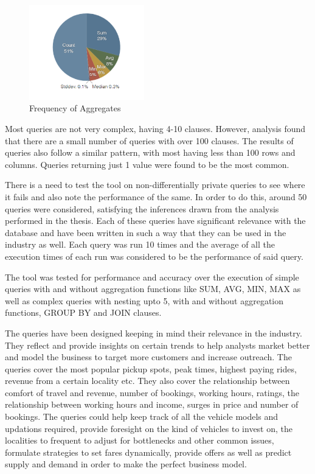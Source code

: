 \documentclass[acmsmall]{acmart}
\begin{document}
\begin{figure}[htp]
    \centering
    \includegraphics[width=5cm]{Fig 4.2.3.png}
    \caption{Frequency of Aggregates}
    \label{fig:4.2.3}
\end{figure}

Most queries are not very complex, having 4-10 clauses. However, analysis found that there are a small number of queries with over 100 clauses. The results of queries also follow a similar pattern, with most having less than 100 rows and columns. Queries returning just 1 value were found to be the most common.

There is a need to test the tool on non-differentially private queries to see where it fails and also note the performance of the same. In order to do this, around 50 queries were considered, satisfying the inferences drawn from the analysis performed in the thesis. Each of these queries have significant relevance with the database and have been written in such a way that they can be used in the industry as well. Each  query was run 10 times and the average of all the execution times of each run was considered to be the performance of said query. 

The tool was tested for performance and accuracy over the execution of simple queries with and without aggregation functions like SUM, AVG, MIN, MAX as well as complex queries with nesting upto 5, with and without aggregation functions, GROUP BY and JOIN clauses.

The queries have been designed keeping in mind their relevance in the industry. They reflect and provide insights on certain trends to help analysts market better and model the business to target more customers and increase outreach. The queries cover the most popular pickup spots, peak times, highest paying rides, revenue from a certain locality etc. They also cover the relationship between comfort of travel and revenue, number of bookings, working hours, ratings, the relationship between working hours and income, surges in price and number of bookings. The queries could help keep track of all the vehicle models and updations required, provide foresight on the kind of vehicles to invest on, the localities to frequent to adjust for bottlenecks and other common issues, formulate strategies to set fares dynamically, provide offers as well as predict supply and demand in order to make the perfect business model.
\end{document}
